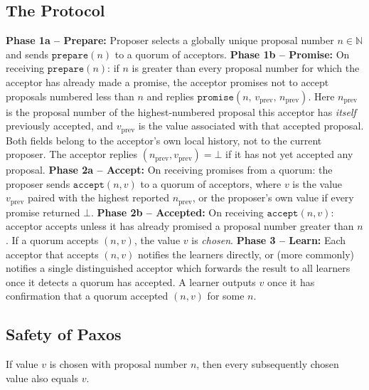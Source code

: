 \subsection{The Protocol}
\begin{algorithm}[H]
\caption{Paxos (Single-Decree)}\label{alg:paxos}
\begin{algorithmic}[1]
\State \textbf{Phase 1a -- Prepare:} Proposer selects a globally unique proposal number $n\in\mathbb{N}$ and sends $\texttt{prepare}(n)$ to a quorum of acceptors.
\State \textbf{Phase 1b -- Promise:} On receiving $\texttt{prepare}(n)$: if $n$ is greater than every proposal number for which the acceptor has already made a promise, the acceptor promises not to accept proposals numbered less than $n$ and replies $\texttt{promise}(n,\, v_{\mathrm{prev}},\, n_{\mathrm{prev}})$. Here $n_{\mathrm{prev}}$ is the proposal number of the highest-numbered proposal this acceptor has \emph{itself} previously accepted, and $v_{\mathrm{prev}}$ is the value associated with that accepted proposal. Both fields belong to the acceptor's own local history, not to the current proposer. The acceptor replies $(n_{\mathrm{prev}}, v_{\mathrm{prev}}) = \bot$ if it has not yet accepted any proposal.
\State \textbf{Phase 2a -- Accept:} On receiving promises from a quorum: the proposer sends $\texttt{accept}(n, v)$ to a quorum of acceptors, where $v$ is the value $v_{\mathrm{prev}}$ paired with the highest reported $n_{\mathrm{prev}}$, or the proposer's own value if every promise returned $\bot$.
\State \textbf{Phase 2b -- Accepted:} On receiving $\texttt{accept}(n,v)$: acceptor accepts unless it has already promised a proposal number greater than $n$. If a quorum accepts $(n,v)$, the value $v$ is \emph{chosen}.
\State \textbf{Phase 3 -- Learn:} Each acceptor that accepts $(n,v)$ notifies the learners directly, or (more commonly) notifies a single distinguished acceptor which forwards the result to all learners once it detects a quorum has accepted. A learner outputs $v$ once it has confirmation that a quorum accepted $(n,v)$ for some $n$.
\end{algorithmic}
\end{algorithm}

\subsection{Safety of Paxos}\label{subsec:paxos-safety}

\begin{smjtheorem}[Safety]\label{thm:paxos-safety}
If value $v$ is chosen with proposal number $n$, then every subsequently chosen value also equals $v$.
\end{smjtheorem}

